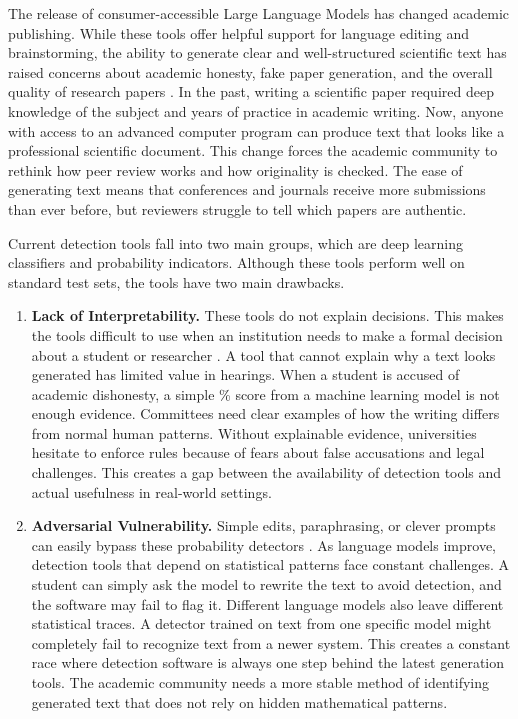 \documentclass{article}
\begin{document}
The release of consumer-accessible Large Language Models has changed academic publishing. While these tools offer helpful support for language editing and brainstorming, the ability to generate clear and well-structured scientific text has raised concerns about academic honesty, fake paper generation, and the overall quality of research papers \cite{ref4,ref5}. In the past, writing a scientific paper required deep knowledge of the subject and years of practice in academic writing. Now, anyone with access to an advanced computer program can produce text that looks like a professional scientific document. This change forces the academic community to rethink how peer review works and how originality is checked. The ease of generating text means that conferences and journals receive more submissions than ever before, but reviewers struggle to tell which papers are authentic.

Current detection tools fall into two main groups, which are deep learning classifiers and probability indicators. Although these tools perform well on standard test sets, the tools have two main drawbacks.

\begin{enumerate}
  \item \textbf{Lack of Interpretability.} These tools do not explain decisions. This makes the tools difficult to use when an institution needs to make a formal decision about a student or researcher \cite{ref6}. A tool that cannot explain why a text looks generated has limited value in hearings. When a student is accused of academic dishonesty, a simple \% score from a machine learning model is not enough evidence. Committees need clear examples of how the writing differs from normal human patterns. Without explainable evidence, universities hesitate to enforce rules because of fears about false accusations and legal challenges. This creates a gap between the availability of detection tools and actual usefulness in real-world settings.
  \item \textbf{Adversarial Vulnerability.} Simple edits, paraphrasing, or clever prompts can easily bypass these probability detectors \cite{ref7}. As language models improve, detection tools that depend on statistical patterns face constant challenges. A student can simply ask the model to rewrite the text to avoid detection, and the software may fail to flag it. Different language models also leave different statistical traces. A detector trained on text from one specific model might completely fail to recognize text from a newer system. This creates a constant race where detection software is always one step behind the latest generation tools. The academic community needs a more stable method of identifying generated text that does not rely on hidden mathematical patterns.
\end{enumerate}
\end{document}
